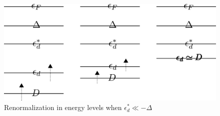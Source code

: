 \documentclass[twoside]{report}
\numberwithin{equation}{section}
\begin{document}
\begin{figure}
	\centering \includegraphics[scale=0.29]{../figures/empty.png}\caption{Renormalization in energy levels when \(\epsilon_d^* \ll -\Delta\)}
\end{figure}
\end{document}
